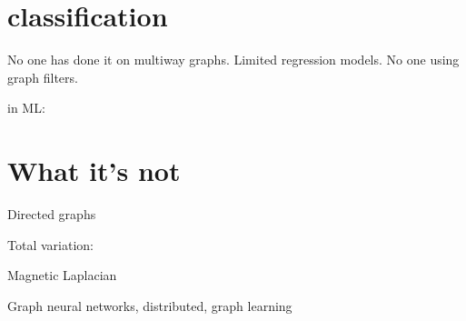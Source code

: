 \cite{Zhao2023}

\cite{Li2012}



\section{classification}

\cite{Tran2020}

No one has done it on multiway graphs. Limited regression models. No one using graph filters. 

in ML: \citep{Belkin2002}

\section{What it's not}

Directed graphs  \cite{Chung2005, Bauer2012}

Total variation: \citep{Shafipour2019,Sardellitti2017}

Magnetic Laplacian \citep{DeResende2020,Zhang2021,Furutani2020}

Graph neural networks, distributed, graph learning
